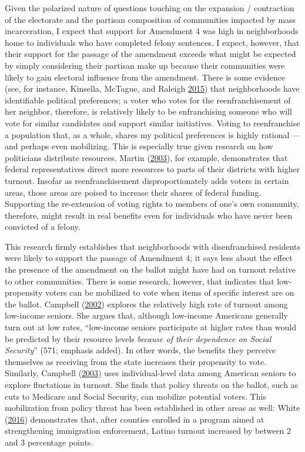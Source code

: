 \documentclass[
  12pt,
]{article}
\begin{document}
Given the polarized nature of questions touching on the expansion / contraction of the electorate and the partisan composition of communities impacted by mass incarceration, I expect that support for Amendment 4 was high in neighborhoods home to individuals who have completed felony sentences. I expect, however, that their support for the passage of the amendment exceeds what might be expected by simply considering their partisan make up because their communities were likely to gain electoral influence from the amendment. There is some evidence (see, for instance, Kinsella, McTague, and Raleigh \protect\hyperlink{ref-Kinsella2015}{2015}) that neighborhoods have identifiable political preferences; a voter who votes for the reenfranchisement of her neighbor, therefore, is relatively likely to be enfranchising someone who will vote for similar candidates and support similar initiatives. Voting to reenfranchise a population that, as a whole, shares my political preferences is highly rational --- and perhaps even mobilizing. This is especially true given research on how politicians distribute resources. Martin (\protect\hyperlink{ref-Martin2003}{2003}), for example, demonstrates that federal representatives direct more resources to parts of their districts with higher turnout. Insofar as reenfranchisement disproportionately adds voters in certain areas, those areas are poised to increase their shares of federal funding. Supporting the re-extension of voting rights to members of one's own community, therefore, might result in real benefits even for individuals who have never been convicted of a felony.

This research firmly establishes that neighborhoods with disenfranchised residents were likely to support the passage of Amendment 4; it says less about the effect the presence of the amendment on the ballot might have had on turnout relative to other communities. There is some research, however, that indicates that low-propensity voters can be mobilized to vote when items of specific interest are on the ballot. Campbell (\protect\hyperlink{ref-Campbell2002}{2002}) explores the relatively high rate of turnout among low-income seniors. She argues that, although low-income Americans generally turn out at low rates, ``low-income seniors participate at higher rates than would be predicted by their resource levels \emph{because of their dependence on Social Security}'' (571; emphasis added). In other words, the benefits they perceive themselves as receiving from the state increases their propensity to vote. Similarly, Campbell (\protect\hyperlink{ref-Campbell2003}{2003}) uses individual-level data among American seniors to explore fluctations in turnout. She finds that policy threats on the ballot, such as cuts to Medicare and Social Security, can mobilize potential voters. This mobilization from policy threat has been established in other areas as well: White (\protect\hyperlink{ref-White2016}{2016}) demonstrates that, after counties enrolled in a program aimed at strengthening immigration enforcement, Latino turnout increased by between 2 and 3 percentage points.
\end{document}
